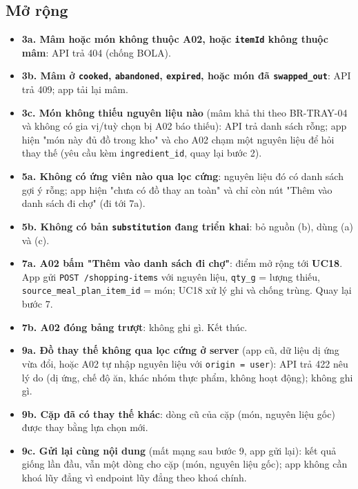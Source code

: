 \subsection{Mở rộng}
\begin{itemize}
\item \textbf{3a. Mâm hoặc món không thuộc A02, hoặc {\small\texttt{itemId}} không thuộc mâm}: API trả 404 (chống BOLA).
\item \textbf{3b. Mâm ở {\small\texttt{cooked}}, {\small\texttt{abandoned}}, {\small\texttt{expired}}, hoặc món đã {\small\texttt{swapped\_\allowbreak{}\allowbreak{}out}}}: API trả 409; app tải lại mâm.
\item \textbf{3c. Món không thiếu nguyên liệu nào} (mâm khả thi theo BR-\allowbreak{}TRAY-\allowbreak{}04 và không có gia vị/\allowbreak{}tuỳ chọn bị A02 báo thiếu): API trả danh sách rỗng; app hiện "món này đủ đồ trong kho" và cho A02 chạm một nguyên liệu để hỏi thay thế (yêu cầu kèm {\small\texttt{ingredient\_\allowbreak{}\allowbreak{}id}}, quay lại bước 2).
\item \textbf{5a. Không có ứng viên nào qua lọc cứng}: nguyên liệu đó có danh sách gợi ý rỗng; app hiện "chưa có đồ thay an toàn" và chỉ còn nút "Thêm vào danh sách đi chợ" (đi tới 7a).
\item \textbf{5b. Không có bản {\small\texttt{substitution}} đang triển khai}: bỏ nguồn (b), dùng (a) và (c).
\item \textbf{7a. A02 bấm "Thêm vào danh sách đi chợ"}: điểm mở rộng tới \textbf{UC18}. App gửi {\small\texttt{POST /\allowbreak{}\allowbreak{}shopping-\allowbreak{}items}} với nguyên liệu, {\small\texttt{qty\_\allowbreak{}\allowbreak{}g}} = lượng thiếu, {\small\texttt{source\_\allowbreak{}\allowbreak{}meal\_\allowbreak{}\allowbreak{}plan\_\allowbreak{}\allowbreak{}item\_\allowbreak{}\allowbreak{}id}} = món; UC18 xử lý ghi và chống trùng. Quay lại bước 7.
\item \textbf{7b. A02 đóng bảng trượt}: không ghi gì. Kết thúc.
\item \textbf{9a. Đồ thay thế không qua lọc cứng ở server} (app cũ, dữ liệu dị ứng vừa đổi, hoặc A02 tự nhập nguyên liệu với {\small\texttt{origin = user}}): API trả 422 nêu lý do (dị ứng, chế độ ăn, khác nhóm thực phẩm, không hoạt động); không ghi gì.
\item \textbf{9b. Cặp đã có thay thế khác}: dòng cũ của cặp (món, nguyên liệu gốc) được thay bằng lựa chọn mới.
\item \textbf{9c. Gửi lại cùng nội dung} (mất mạng sau bước 9, app gửi lại): kết quả giống lần đầu, vẫn một dòng cho cặp (món, nguyên liệu gốc); app không cần khoá lũy đẳng vì endpoint lũy đẳng theo khoá chính.

\end{itemize}
